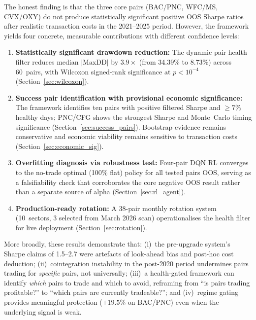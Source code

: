 \documentclass{ieeeaccess}
\begin{document}
The honest finding is that the three core pairs (BAC/PNC, WFC/MS, CVX/OXY) do not produce statistically significant positive OOS Sharpe ratios after realistic transaction costs in the 2021--2025 period.
However, the framework yields four concrete, measurable contributions with different confidence levels:

\begin{enumerate}
    \item \textbf{Statistically significant drawdown reduction:} The dynamic pair health filter reduces median $|\text{MaxDD}|$ by $3.9\times$ (from 34.39\% to 8.73\%) across 60~pairs, with Wilcoxon signed-rank significance at $p < 10^{-4}$ (Section~\ref{sec:wilcoxon}).
    \item \textbf{Success pair identification with provisional economic significance:} The framework identifies ten pairs with positive filtered Sharpe and $\geq 7\%$ healthy days; PNC/CFG shows the strongest Sharpe and Monte~Carlo timing significance (Section~\ref{sec:success_pairs}).
    Bootstrap evidence remains conservative and economic viability remains sensitive to transaction costs (Section~\ref{sec:economic_sig}).
    \item \textbf{Overfitting diagnosis via robustness test:} Four-pair DQN RL converges to the no-trade optimal (100\% flat) policy for all tested pairs OOS, serving as a falsifiability check that corroborates the core negative OOS result rather than a separate source of alpha (Section~\ref{sec:rl_agent}).
    \item \textbf{Production-ready rotation:} A 38-pair monthly rotation system (10~sectors, 3 selected from March 2026 scan) operationalises the health filter for live deployment (Section~\ref{sec:rotation}).
\end{enumerate}

More broadly, these results demonstrate that:
(i)~the pre-upgrade system's Sharpe claims of 1.5--2.7 were artefacts of look-ahead bias and post-hoc cost deduction;
(ii)~cointegration instability in the post-2020 period undermines pairs trading for \emph{specific} pairs, not universally;
(iii)~a health-gated framework can identify \emph{which} pairs to trade and which to avoid, reframing from ``is pairs trading profitable?'' to ``which pairs are currently tradeable?''; and
(iv)~regime gating provides meaningful protection ($+19.5\%$ on BAC/PNC) even when the underlying signal is weak.
\end{document}
